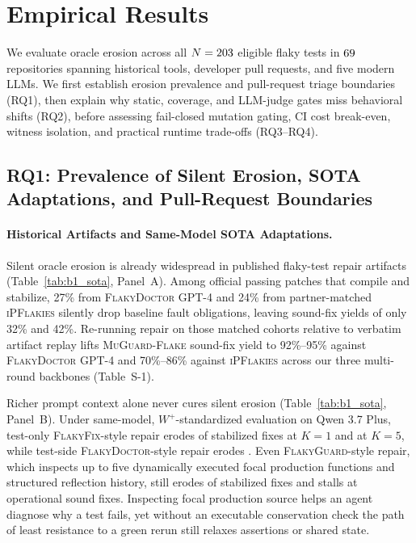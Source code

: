\section{Empirical Results}
\label{sec:results}

We evaluate oracle erosion across all $N = 203$ eligible flaky tests in $69$ repositories spanning historical tools, developer pull requests, and five modern LLMs. We first establish erosion prevalence and pull-request triage boundaries (RQ1), then explain why static, coverage, and LLM-judge gates miss behavioral shifts (RQ2), before assessing fail-closed mutation gating, CI cost break-even, witness isolation, and practical runtime trade-offs (RQ3--RQ4).

\subsection{RQ1: Prevalence of Silent Erosion, SOTA Adaptations, and Pull-Request Boundaries}
\label{sec:rq1}

\paragraph{Historical Artifacts and Same-Model SOTA Adaptations.}
Silent oracle erosion is already widespread in published flaky-test repair artifacts (Table~\ref{tab:b1_sota}, Panel~A). Among official passing patches that compile and stabilize, 27\% from \textsc{FlakyDoctor} GPT-4 and 24\% from partner-matched \textsc{iPFlakies} silently drop baseline fault obligations, leaving sound-fix yields of only 32\% and 42\%. Re-running repair on those matched cohorts relative to verbatim artifact replay lifts \textsc{MuGuard-Flake} sound-fix yield to 92\%--95\% against \textsc{FlakyDoctor} GPT-4 and 70\%--86\% against \textsc{iPFlakies} across our three multi-round backbones (Table~S-1).

Richer prompt context alone never cures silent erosion (Table~\ref{tab:b1_sota}, Panel~B). Under same-model, $W^+$-standardized evaluation on Qwen 3.7 Plus, test-only \textsc{FlakyFix}-style repair erodes \SotaFFOneLeakPct{} of stabilized fixes at $K=1$ and \SotaFFFiveLeakPct{} at $K=5$, while test-side \textsc{FlakyDoctor}-style repair erodes \SotaFDLeakPct{}. Even \textsc{FlakyGuard}-style repair, which inspects up to five dynamically executed focal production functions and structured reflection history, still erodes \SotaFGLeakPct{} of stabilized fixes and stalls at \SotaFGSoundPct{} operational sound fixes. Inspecting focal production source helps an agent diagnose why a test fails, yet without an executable conservation check the path of least resistance to a green rerun still relaxes assertions or shared state.

